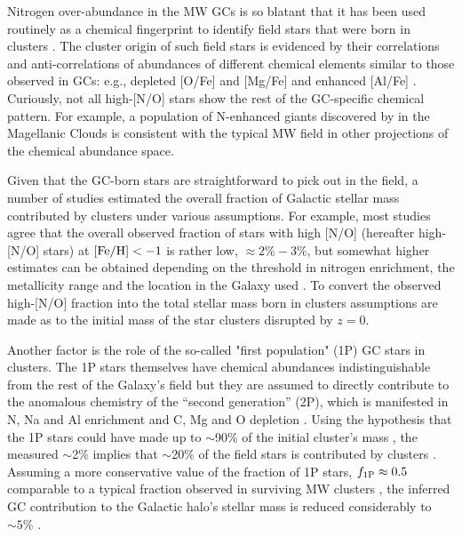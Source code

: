 \documentclass[a4paper,useAMS,usenatbib]{mnras}
\begin{document}
Nitrogen over-abundance in the MW GCs is so blatant that it has been used routinely as a chemical fingerprint to identify field stars that were born in clusters \citep[see, e.g.,][]{Martell_Grebel2010,Carollo2013,Martell2016,Schiavon2017,Fernandez_Trincado2017,Tang2019,Horta2021,Phillips2022}. The cluster origin of such field stars is evidenced by their correlations and anti-correlations of abundances of different chemical elements similar to those observed in GCs: e.g., depleted [O/Fe] and [Mg/Fe] and enhanced [Al/Fe] \citep[see e.g.][]{Lind2015,Schiavon2017,Fernandez_Trincado2020b,Horta2021}. Curiously, not all high-[N/O] stars show the rest of the GC-specific chemical pattern. For example, a population of N-enhanced giants discovered by \citet{Fernandez_Trincado2020} in the Magellanic Clouds is consistent with the typical MW field in other projections of the chemical abundance space. 

Given that the GC-born stars are straightforward to pick out in the field, a number of studies estimated the overall fraction of Galactic stellar mass contributed by clusters under various assumptions. For example, most studies agree that the overall observed fraction of stars with high [N/O] (hereafter high-[N/O] stars) at $\rm [Fe/H]<-1$ is rather low,  $\approx 2\%-3\%$, but somewhat higher estimates can be obtained depending on the threshold in nitrogen enrichment, the metallicity range and the location in the Galaxy used \citep[see, e.g.,][]{Martell2016, Schiavon2017, Koch2019, Horta2021}. To convert the observed high-[N/O] fraction into the total stellar mass born in clusters assumptions are made as to the initial mass of the star clusters disrupted by $z=0$. 

Another factor is the role of the so-called "first population" (1P) GC stars in clusters. 
The 1P stars themselves have chemical abundances indistinguishable from the rest of the Galaxy's field but they are assumed to directly contribute to the anomalous chemistry of the ``second generation'' (2P), which is manifested in N, Na and Al enrichment and C, Mg and O depletion \citep{Bastian_Lardo2018, Gratton2019, Miloni_Marino2022}. Using the hypothesis that the 1P stars could have made up to $\sim$90\% of the initial cluster's mass \citep[e.g.,][]{Dercole2008,Conroy2012,Bastian2013}, the measured $\sim$2\% implies that $\sim$20\%  of the field stars is contributed by clusters \citep[e.g.,][]{Martell2011}. Assuming a more conservative value of the fraction of 1P stars, $f_{\rm 1P}\approx 0.5$ comparable to a typical fraction observed in surviving MW clusters \citep[][]{Milone2017}, the inferred GC contribution to the Galactic halo's stellar mass is reduced considerably to $\sim 5\%$ \citep[see][]{Koch2019}.
\end{document}
